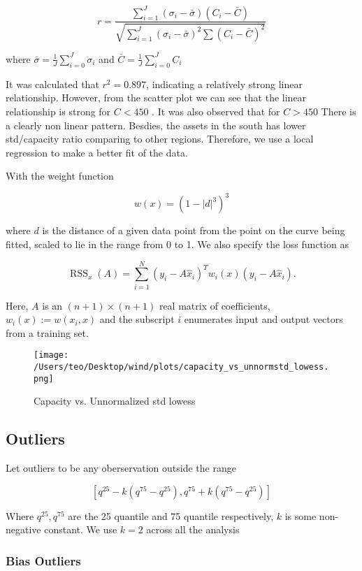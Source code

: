 \documentclass[
]{article}
\begin{document}
\[r=\frac{\sum_{i = 1}^J\left(\sigma_{i}-\bar{\sigma}\right)\left(C_{i}-\bar{C}\right)}{\sqrt{\sum_{i = 1}^J\left(\sigma_{i}-\bar{\sigma}\right)^{2} \sum\left(C_{i}-\bar{C}\right)^{2}}}\]

where \(\bar{\sigma} = \frac{1}{J} \sum_{i = 0}^J \sigma_i\) and
\(\bar{C} = \frac{1}{J} \sum_{i = 0}^J C_i\)

It was calculated that \(r^2 = 0.897\), indicating a relatively strong
linear relationship. However, from the scatter plot we can see that the
linear relationship is strong for \(C < 450\) . It was also observed
that for \(C>450\) There is a clearly non linear pattern. Besdies, the
assets in the south has lower std/capacity ratio comparing to other
regions. Therefore, we use a local regression to make a better fit of
the data.

With the weight function

\[w(x)=\left(1-|d|^{3}\right)^{3}\]

where \(d\) is the distance of a given data point from the point on the
curve being fitted, scaled to lie in the range from 0 to 1. We also
specify the loss function as

\[\operatorname{RSS}_{x}(A)=\sum_{i=1}^{N}\left(y_{i}-A \hat{x}_{i}\right)^{T} w_{i}(x)\left(y_{i}-A \hat{x}_{i}\right) .\]

Here, \(A\) is an \((n+1) \times(n+1)\) real matrix of coefficients,
\(w_{i}(x):=w\left(x_{i}, x\right)\) and the subscript \(i\) enumerates
input and output vectors from a training set.

\begin{figure}
\centering
\texttt{[image: /Users/teo/Desktop/wind/plots/capacity\_vs\_unnormstd\_lowess.png]}
\caption{Capacity vs. Unnormalized std lowess}
\end{figure}

\hypertarget{outliers}{%
\subsection{Outliers}\label{outliers}}

Let outliers to be any oberservation outside the range

\[\left[q^{25}-k\left(q^{75}-q^{25}\right), q^{75}+k\left(q^{75}-q^{25}\right)\right]\]

Where \(q^{25},q^{75}\) are the 25 quantile and 75 quantile
respectively, \(k\) is some non-negative constant. We use \(k=2\) across
all the analysis

\hypertarget{bias-outliers}{%
\subsubsection{Bias Outliers}\label{bias-outliers}}
\end{document}
